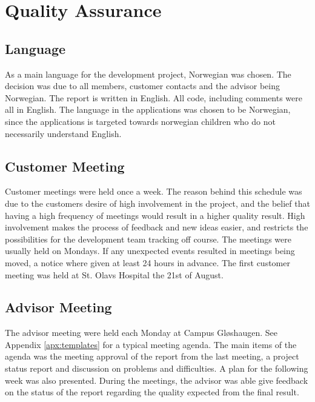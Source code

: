 \section{Quality Assurance}
\label{sec:qualityAssurance}
\subsection{Language}
As a main language for the development project, Norwegian was chosen. 
The decision was due to all members, customer contacts and the advisor 
being Norwegian. The report is written in English. All code, including comments were all in English. The language in the applications was chosen
to be Norwegian, since the applications is targeted towards norwegian 
children who do not necessarily understand English.

\subsection{Customer Meeting}
Customer meetings were held once a week. The reason behind this schedule 
was due to the customers desire of high involvement in the project, and 
the belief that having a high frequency of meetings would result in a higher 
quality result. High involvement makes the process of feedback and new ideas 
easier, and restricts the possibilities for the development team tracking 
off course. The meetings were usually held on Mondays. If any unexpected 
events resulted in meetings being moved, a notice where given at least 24 hours in advance. 
The first customer meeting was held at St. Olavs Hospital the 21st of August. 

\subsection{Advisor Meeting}
The advisor meeting were held each Monday at Campus Gl\o shaugen. See Appendix \ref{apx:templates} 
for a typical meeting agenda. The main items of the agenda was the meeting approval of the report from the last 
meeting, a project status report and discussion on problems and difficulties. 
A plan for the following week was also presented. During the meetings, the 
advisor was able give feedback on the status of the report regarding the 
quality expected from the final result. 


